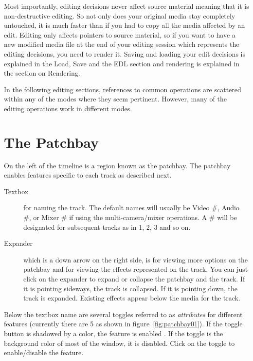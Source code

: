 Most importantly, editing decisions never affect source material meaning that it is non-destructive editing.  So not only does your original media stay completely untouched, it is much faster than if you had to copy all the media affected by an edit.  Editing only affects pointers to source material, so if you want to have a new modified media file at the end of your editing session which represents the editing decisions, you need to render it.  Saving and loading your edit decisions is explained in the Load, Save and the EDL section and rendering is explained in the section on Rendering.

In the following editing sections, references to common operations are scattered within any of the modes where they seem pertinent.  However, many of the editing operations work in different modes.

\section{The Patchbay}%
\label{sec:patchbay}

On the left of the timeline is a region known as the patchbay.  The patchbay enables features specific to each track as described next.


\begin{description}
    \item[Textbox] for naming the track.  The default names will usually be Video \#, Audio \#, or Mixer \# if using the multi-camera/mixer operations.  A \# will be designated for subsequent tracks as in 1, 2, 3 and so on.
    \item[Expander] which is a down arrow on the right side, is for viewing more options on the patchbay and for viewing the effects represented on the track.   You can just click on the expander to expand or collapse the patchbay and the track.  If it is pointing sideways, the track is collapsed.  If it is pointing down, the track is expanded.  Existing effects appear below the media for the track.
\end{description}

\noindent Below the textbox name are several toggles referred to as \textit{attributes} for different features (currently there are 5 as shown in figure~\ref{fig:patchbay01}).  If the toggle button is shadowed by a color, the feature is enabled . If the toggle is the background color of most of the window, it is disabled. Click 
on the toggle to enable/disable the feature.

